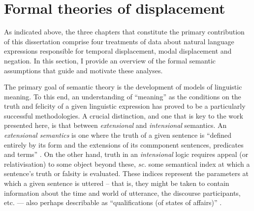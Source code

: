 \documentclass[12pt,dvipsnames]{report}
\begin{document}
%			
\section{Formal theories of displacement}\label{LitRev}






As indicated above, the three chapters that constitute the primary contribution of this dissertation comprise four treatments of data about natural language expressions responsible for temporal displacement, modal displacement and negation. In this section, I provide an overview of the formal semantic assumptions that guide and motivate these analyses.


The primary goal of semantic theory is the development of models of linguistic meaning. To this end, an understanding of ``meaning'' as the conditions on the truth and felicity of a given linguistic expression has proved to be a particularly successful methodologies. A crucial distinction, and one that is key to the work presented here, is that between \textit{extensional} and \textit{intensional} semantics. An \textit{extensional semantics} is one where the truth of a given sentence is ``defined entirely by its form and the extensions of its commponent sentences, predicates and terms'' \citep{Menzel2017}. On the other hand, truth in an \textit{intensional} logic requires appeal (or relativisation) to some object beyond these, \textit{sc.} some semantical index at which a sentence's truth or falsity is evaluated. These indices represent the parameters at which a given sentence is uttered -- that is, they might be taken to contain information about the time and world of utterance, the discourse participants, etc. --- also perhaps describable as ``qualifications (of states of affairs)'' \citep{Nuyts2005}.
\end{document}
